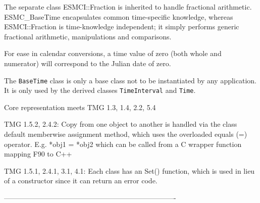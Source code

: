    The separate class ESMCI::Fraction is inherited to handle fractional
   arithmetic.  ESMC_BaseTime encapsulates common time-specific knowledge,
   whereas ESMCI::Fraction is time-knowledge independent; it simply performs
   generic fractional arithmetic, manipulations and comparisons.
  
   For ease in calendar conversions, a time value of zero (both whole and
   numerator) will correspond to the Julian date of zero.
  
   The {\tt BaseTime} class is only a base class not to be instantiated by any
   application. It is only used by the derived classes {\tt TimeInterval} and
   {\tt Time}.
  
   Core representation meets TMG 1.3, 1.4, 2.2, 5.4
  
   TMG 1.5.2, 2.4.2: Copy from one object to another is handled
   via the class default memberwise assignment method, which uses
   the overloaded equals (=) operator.  E.g.  *obj1 = *obj2 which
   can be called from a C wrapper function mapping F90 to C++
  
   TMG 1.5.1, 2.4.1, 3.1, 4.1: Each class has an Set() function,
   which is used in lieu of a constructor since it can
   return an error code.
  
  -------------------------------------------------------------------------
  

